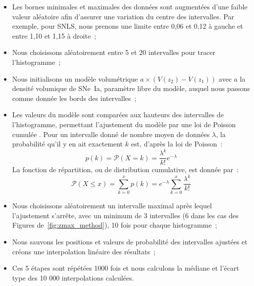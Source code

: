 \documentclass[../main/main.tex]{subfiles}
\begin{document}
\begin{itemize}
    \item Les bornes minimales et maximales des données sont augmentées d'une
        faible valeur aléatoire afin d'assurer une variation du centre des
        intervalles. Par exemple, pour SNLS, nous prenons une limite entre 0,06
        et 0,12 à gauche et entre 1,10 et 1,15 à droite~;
    \item Nous choisissons aléatoirement entre 5 et 20 intervalles pour tracer
        l'histogramme~;
    \item Nous initialisons un modèle volumétrique $a\times
        \left(V(z_2)-V(z_1)\right)$ avec $a$ la densité volumique de SNe~Ia,
        paramètre libre du modèle, auquel nous passons comme donnée les bords
        des intervalles~;
    \item Les valeurs du modèle sont comparées aux hauteurs des intervalles de
        l'histogramme, permettant l'ajustement du modèle par une loi de Poisson
        cumulée \citep[voir par exemple][]{syed2015}. Pour un intervalle donné
        de nombre moyen de données $\lambda$, la probabilité qu'il y en ait
        exactement $k$ est, d'après la loi de Poisson~:
        \begin{equation}\label{eq:poisson}
            p(k) = \mathcal{P}(X = k) = \frac{\lambda^k}{k!}e^{-\lambda}
        \end{equation}
        La fonction de répartition, ou de distribution cumulative, est donnée
        par~:
        \begin{equation}\label{eq:pcdf}
            \mathcal{P}(X\leq x) = \sum_{k=0}^{x}p(k) = e^{-\lambda}
            \sum_{k=0}^{x} \frac{\lambda^k}{k!}
        \end{equation}
    \item Nous choisissons aléatoirement un intervalle maximal après lequel
        l'ajustement s'arrête, avec un minimum de 3 intervalles (6 dans les cas
        des Figures de~\ref{fig:zmax_method}), 10 fois pour chaque histogramme~;
    \item Nous sauvons les positions et valeurs de probabilité des intervalles
        ajustées et créons une interpolation linéaire des résultats~;
    \item Ces 5 étapes sont répétées 1000 fois et nous calculons la médiane et
        l'écart type des 10 000 interpolations calculées.
\end{itemize}
\end{document}
